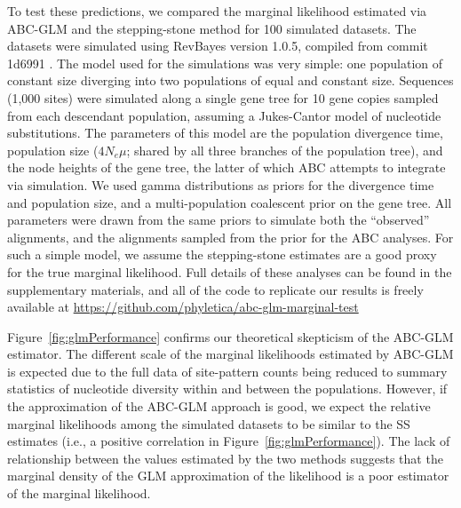To test these predictions, we compared the marginal likelihood estimated via
ABC-GLM and the stepping-stone method \citep{Xie2011} for 100 simulated
datasets.
The datasets were simulated using RevBayes version 1.0.5, compiled from commit
1d6991 \citep{Hohna2014,Hohna2016}.
The model used for the simulations was very simple:
one population of constant size diverging into two populations of equal and
constant size.
Sequences (1,000 sites) were simulated along a single gene tree for 10 gene
copies sampled from each descendant population, assuming a Jukes-Cantor
\citep{JC1969} model of nucleotide substitutions.
The parameters of this model are the population divergence time, population
size ($4N_e\mu$; shared by all three branches of the population tree), and the
node heights of the gene tree, the latter of which ABC attempts to integrate
via simulation.
We used gamma distributions as priors for the divergence time and population
size, and a multi-population coalescent prior on the gene tree.
All parameters were drawn from the same priors to simulate both the
``observed'' alignments, and the alignments sampled from the prior for the ABC
analyses.
For such a simple model, we assume the stepping-stone estimates are a good
proxy for the true marginal likelihood.
Full details of these analyses can be found in the supplementary materials, and
all of the code to replicate our results is freely available at
\href{https://github.com/phyletica/abc-glm-marginal-test}{https://github.com/phyletica/abc-glm-marginal-test}

Figure~\ref{fig:glmPerformance} confirms our theoretical skepticism of the
ABC-GLM estimator.
The different scale of the marginal likelihoods estimated by ABC-GLM is
expected due to the full data of site-pattern counts being reduced
to summary statistics of nucleotide diversity within and between the
populations.
However, if the approximation of the ABC-GLM approach is good, we expect the
relative marginal likelihoods among the simulated datasets to be similar to the
SS estimates (i.e., a positive correlation in Figure~\ref{fig:glmPerformance}).
The lack of relationship between the values estimated by the two methods
suggests that the marginal density of the GLM approximation of the likelihood
is a poor estimator of the marginal likelihood.

